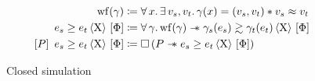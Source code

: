 \begin{figure}[tp]
    \begin{align*}
    		\wf{\gamma}
    		&\coloneqq
    		\forall x \ldotp
    		\exists v_s, v_t \ldotp
    		\gamma (x) = (v_s, v_t) \iSep
    		v_s \iSimilar v_t
    	\\
    		\iCsimv[\Chi]{\Phi}{e_s}{e_t}
    		&\coloneqq
    		\forall \gamma \ldotp
    		\wf{\gamma} \iSepImp
    		\iSimv[\Chi]{\Phi}{\gamma_s (e_s)}{\gamma_t (e_t)}
    	\\
    	   \iCsimvHoare[\Chi]{P}{\Phi}{e_s}{e_t}
    	   &\coloneqq
    	   \iPersistent \left( P \iSepImp \iCsimv[\Chi]{\Phi}{e_s}{e_t} \right)
    \end{align*}
    \caption{Closed simulation}
    \label{fig:csim}
\end{figure}